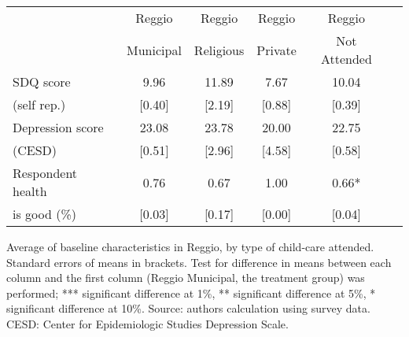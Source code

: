 
\centering
\begin{adjustbox}{width=0.9\textwidth,center=\textwidth}
\small
\begin{tabular}{m{4.0cm} ccccc}
\hline \hline 
& Reggio & Reggio & Reggio & Reggio \\
 & Municipal & Religious & Private & Not Attended \\
 \hline
SDQ score &  9.96  &  11.89  &  7.67  &  10.04  \\ 
(self rep.)  &  [0.40]  &  [2.19]  &  [0.88]  &  [0.39]  \\
Depression score &  23.08  &  23.78  &  20.00  &  22.75  \\
(CESD)    &  [0.51]  &  [2.96]  &  [4.58]  &  [0.58]  \\
Respondent health &  0.76  &  0.67  &  1.00  &  0.66* \\  
is good (\%)    &  [0.03]  &  [0.17]  &  [0.00]  &  [0.04]  \\
\hline
\end{tabular}

\end{adjustbox}
\raggedright{
\footnotesize{Average of baseline characteristics in Reggio, by type of child-care attended. Standard errors of means in brackets. Test for difference in means between each column and the first column (Reggio Municipal, the treatment group) was performed; *** significant difference at 1\%, ** significant difference at 5\%, * significant difference at 10\%. Source: authors calculation using survey data. CESD: Center for Epidemiologic Studies Depression Scale.}
}
